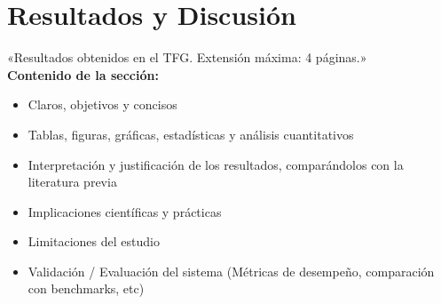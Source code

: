 \chapter{Resultados y Discusión}
«Resultados obtenidos en el TFG.  Extensión máxima: 4 páginas.»\\

\textbf{Contenido de la sección:}
\begin{itemize}
    \item Claros, objetivos y concisos
    \item Tablas, figuras, gráficas, estadísticas y análisis cuantitativos
    \item Interpretación y justificación de los resultados, comparándolos con la literatura previa
    \item Implicaciones científicas y prácticas
    \item Limitaciones del estudio
    \item Validación / Evaluación del sistema (Métricas de desempeño, comparación con benchmarks, etc)
\end{itemize}

